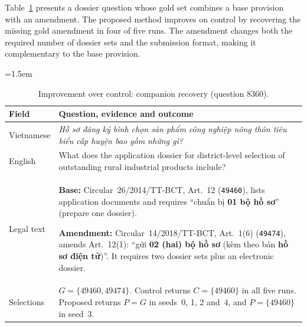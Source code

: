 \begingroup
\setlength{\intextsep}{6pt}
\begin{table}[H]
\noindent\normalsize Table~\ref{tab:case8360} presents a dossier question whose gold set combines a base provision with an amendment. The proposed method improves on control by recovering the missing gold amendment in four of five runs. The amendment changes both the required number of dossier sets and the submission format, making it complementary to the base provision.
\par\vspace{5pt}
\centering\small
\emergencystretch=1.5em
\setlength{\tabcolsep}{4pt}
\renewcommand{\arraystretch}{1.08}
\caption{Improvement over control: companion recovery (question 8360).}
\label{tab:case8360}
\begin{tabularx}{\linewidth}{>{\columncolor{tableband}\raggedright\arraybackslash}p{1.8cm}>{\raggedright\arraybackslash}X}
\hline
\textbf{Field} & \textbf{Question, evidence and outcome}\\\hline
Vietnamese & \emph{Hồ sơ đăng ký bình chọn sản phẩm công nghiệp nông thôn tiêu biểu cấp huyện bao gồm những gì?}\\\hline
English & What does the application dossier for district-level selection of outstanding rural industrial products include?\\\hline
Legal text & \textbf{Base:} Circular~26/2014/TT-BCT, Art.~12 (\texttt{49460}), lists application documents and requires ``chuẩn bị \textbf{01 bộ hồ sơ}'' (prepare one dossier).
\par\smallskip
\textbf{Amendment:} Circular~14/2018/TT-BCT, Art.~1(6) (\texttt{49474}), amends Art.~12(1): ``gửi \textbf{02 (hai) bộ hồ sơ} (kèm theo bản \textbf{hồ sơ điện tử})''. It requires two dossier sets plus an electronic dossier.\\\hline
Selections & $G=\{49460,49474\}$. Control returns $C=\{49460\}$ in all five runs. Proposed returns $P=G$ in seeds~0, 1, 2 and~4, and $P=\{49460\}$ in seed~3.\\
\hline
\end{tabularx}
\end{table}
